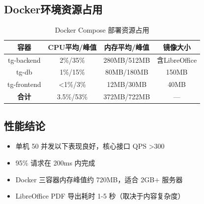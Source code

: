 \subsection{Docker环境资源占用}

\begin{table}[htbp]
    \centering
    \caption{Docker Compose 部署资源占用}
    \begin{tabular}{|c|c|c|c|}
        \hline
        \textbf{容器} & \textbf{CPU平均/峰值} & \textbf{内存平均/峰值} & \textbf{镜像大小} \\
        \hline
        tg-backend & 2\%/35\% & 280MB/512MB & 含LibreOffice \\
        \hline
        tg-db & 1\%/15\% & 80MB/180MB & 150MB \\
        \hline
        tg-frontend & <1\%/3\% & 12MB/30MB & 40MB \\
        \hline
        \textbf{合计} & 3.5\%/53\% & 372MB/722MB & — \\
        \hline
    \end{tabular}
\end{table}

\subsection{性能结论}

\begin{itemize}
    \item 单机 50 并发以下表现良好，核心接口 QPS >300
    \item 95\% 请求在 200ms 内完成
    \item Docker 三容器内存峰值约 720MB，适合 2GB+ 服务器
    \item LibreOffice PDF 导出耗时 1-5 秒（取决于内容复杂度）
\end{itemize}

